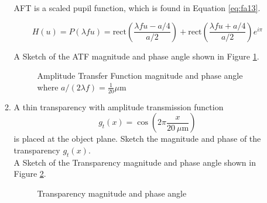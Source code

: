 \documentclass[main.tex]{subfiles}
\begin{document}
\begin{enumerate}
\begin{enumerate}
AFT is a scaled pupil function, which is found in Equation \ref{eq:fa13}.

\begin{equation}\label{eq:fa13}
H(u) = P(\lambda f u) = \text{rect}(\frac{\lambda f u - a/4}{a/2}) + \text{rect}(\frac{\lambda f u + a/4}{a/2}) e^{i\pi}
\end{equation}

A Sketch of the ATF magnitude and phase angle shown in Figure \ref{fig:f2}.

\begin{figure}
\centering{}
\caption{Amplitude Transfer Function magnitude and phase angle where $a/(2\lambda f) = \frac{1}{20}\mu \text{m} $ }
\label{fig:f2}
\end{figure}

\item{A thin transparency with amplitude transmission function}
$$g_t(x)=\cos \left( 2\pi \frac{x}{\SI{20}{\mu \metre} } \right)$$ 
is placed at the object plane. Sketch the magnitude and phase of the transparency $g_t(x)$.\\

A Sketch of the Transparency magnitude and phase angle shown in Figure \ref{fig:f3}.

\begin{figure}
\centering{}
\caption{Transparency magnitude and phase angle}
\label{fig:f3}
\end{figure}


\end{enumerate}
\end{enumerate}
\end{document}
